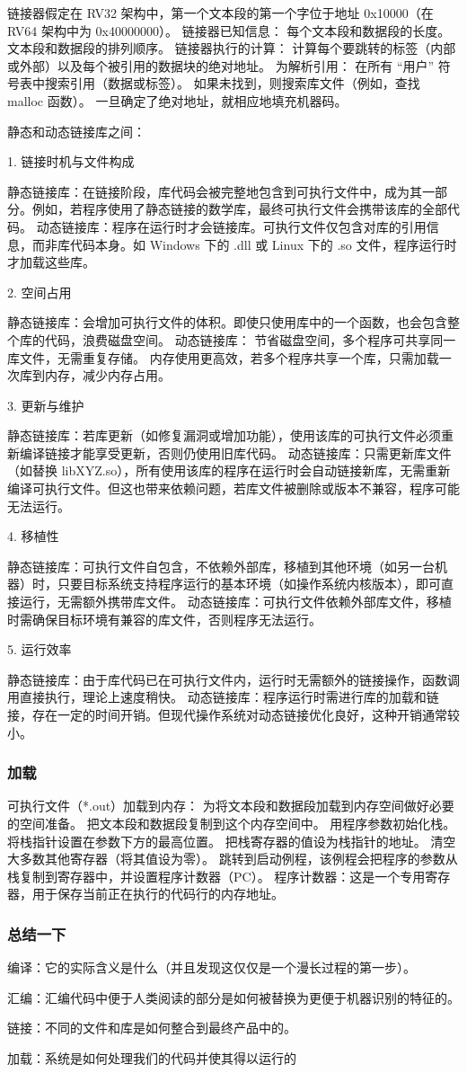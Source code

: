 \documentclass{ctexart}
\begin{document}
链接器假定在 RV32 架构中，第一个文本段的第一个字位于地址 0x10000（在 RV64 架构中为 0x40000000）。
链接器已知信息：
每个文本段和数据段的长度。
文本段和数据段的排列顺序。
链接器执行的计算：
计算每个要跳转的标签（内部或外部）以及每个被引用的数据块的绝对地址。
为解析引用：
在所有 “用户” 符号表中搜索引用（数据或标签）。
如果未找到，则搜索库文件（例如，查找 malloc 函数）。
一旦确定了绝对地址，就相应地填充机器码。\par
静态和动态链接库之间：\par
1. 链接时机与文件构成\par
静态链接库：在链接阶段，库代码会被完整地包含到可执行文件中，成为其一部分。例如，若程序使用了静态链接的数学库，最终可执行文件会携带该库的全部代码。
动态链接库：程序在运行时才会链接库。可执行文件仅包含对库的引用信息，而非库代码本身。如 Windows 下的 .dll 或 Linux 下的 .so 文件，程序运行时才加载这些库。\par
2. 空间占用\par
静态链接库：会增加可执行文件的体积。即使只使用库中的一个函数，也会包含整个库的代码，浪费磁盘空间。
动态链接库：
节省磁盘空间，多个程序可共享同一库文件，无需重复存储。
内存使用更高效，若多个程序共享一个库，只需加载一次库到内存，减少内存占用。\par
3. 更新与维护\par
静态链接库：若库更新（如修复漏洞或增加功能），使用该库的可执行文件必须重新编译链接才能享受更新，否则仍使用旧库代码。
动态链接库：只需更新库文件（如替换 libXYZ.so），所有使用该库的程序在运行时会自动链接新库，无需重新编译可执行文件。但这也带来依赖问题，若库文件被删除或版本不兼容，程序可能无法运行。\par
4. 移植性\par
静态链接库：可执行文件自包含，不依赖外部库，移植到其他环境（如另一台机器）时，只要目标系统支持程序运行的基本环境（如操作系统内核版本），即可直接运行，无需额外携带库文件。
动态链接库：可执行文件依赖外部库文件，移植时需确保目标环境有兼容的库文件，否则程序无法运行。\par
5. 运行效率\par
静态链接库：由于库代码已在可执行文件内，运行时无需额外的链接操作，函数调用直接执行，理论上速度稍快。
动态链接库：程序运行时需进行库的加载和链接，存在一定的时间开销。但现代操作系统对动态链接优化良好，这种开销通常较小。\par
\subsubsection{加载}
可执行文件（*.out）加载到内存：
为将文本段和数据段加载到内存空间做好必要的空间准备。
把文本段和数据段复制到这个内存空间中。
用程序参数初始化栈。
将栈指针设置在参数下方的最高位置。
把栈寄存器的值设为栈指针的地址。
清空大多数其他寄存器（将其值设为零）。
跳转到启动例程，该例程会把程序的参数从栈复制到寄存器中，并设置程序计数器（PC）。
程序计数器：这是一个专用寄存器，用于保存当前正在执行的代码行的内存地址。\par
\subsubsection{总结一下}
编译：它的实际含义是什么（并且发现这仅仅是一个漫长过程的第一步）。\par
汇编：汇编代码中便于人类阅读的部分是如何被替换为更便于机器识别的特征的。\par
链接：不同的文件和库是如何整合到最终产品中的。\par
加载：系统是如何处理我们的代码并使其得以运行的\par
\end{document}
